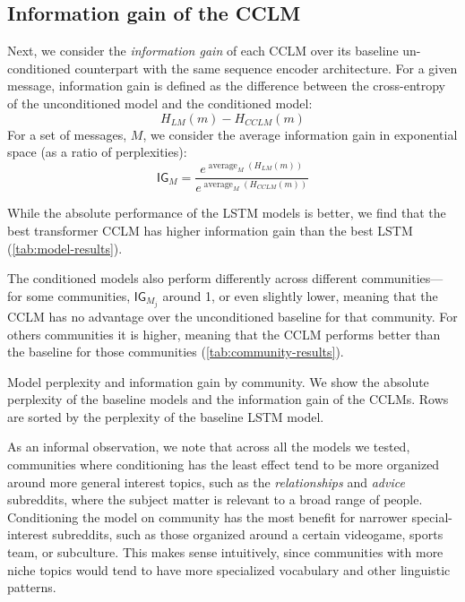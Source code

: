 \documentclass[11pt,a4paper]{article}
\newcommand\jp[1]{\todo[backgroundcolor=blue!10]{JP: #1}}
\newcommand\IG{\mathsf{IG}}
\DeclareMathOperator*{\avg}{average}
\begin{document}
\subsection{Information gain of the CCLM}

Next, we consider the \emph{information gain} of each CCLM over its baseline
un-conditioned counterpart with the same sequence encoder architecture.
For a given message, information gain is defined as the difference
between the cross-entropy of the unconditioned model and the conditioned model:
\[H_{LM}(m) - H_{CCLM}(m)\]
For a set of messages, $M$, we consider the average information gain
in exponential space (as a ratio of perplexities):
\[\IG_M = \frac{e^{\avg_M(H_{LM}(m))}}{e^{\avg_M(H_{CCLM}(m))}}\]


While the absolute performance of the LSTM models is better,
we find that the best transformer CCLM has higher information gain 
than the best LSTM (\cref{tab:model-results}).

The conditioned models also perform differently across different communities---%
for some communities, $\IG_{M_j}$ around \num{1}, or even slightly lower,
meaning that the CCLM has no advantage over the unconditioned baseline for that community.
For others communities it is higher, meaning that the CCLM performs better than 
the baseline for those communities (\cref{tab:community-results}).

\begin{table*}
  \centering
  
  \caption{
    Model perplexity and information gain by community. We show the absolute perplexity 
    of the baseline models and the information gain of the CCLMs.
    Rows are sorted by the perplexity of the baseline
    LSTM model.
}
  \label{tab:community-results}
\end{table*}


As an informal observation, we note that across all the models we
tested, communities where conditioning has the least effect tend to be
more organized around more general interest topics, such as the
\emph{relationships} and \emph{advice} subreddits, where the subject
matter is relevant to a broad range of people.  Conditioning the model
on community has the most benefit for narrower special-interest
subreddits, such as those organized around a certain videogame, sports
team, or subculture.  This makes sense intuitively, since communities
with more niche topics would tend to have more specialized vocabulary
and other linguistic patterns.
\end{document}
